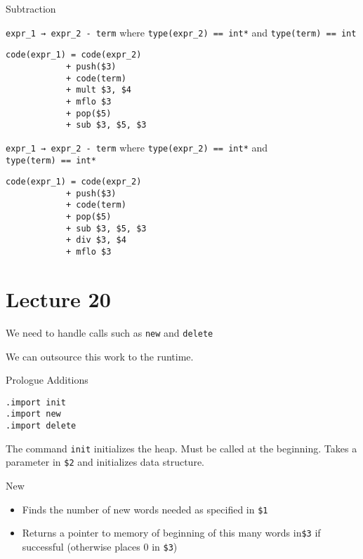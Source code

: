 \documentclass{article}
\begin{document}
Subtraction

\texttt{expr\_1\ →\ expr\_2\ -\ term} where
\texttt{type(expr\_2)\ ==\ int*} and \texttt{type(term)\ ==\ int}

\begin{tcolorbox}
\begin{verbatim}
code(expr_1) = code(expr_2)
            + push($3)
            + code(term)
            + mult $3, $4
            + mflo $3
            + pop($5)
            + sub $3, $5, $3
\end{verbatim}
\end{tcolorbox}

\texttt{expr\_1\ →\ expr\_2\ -\ term} where
\texttt{type(expr\_2)\ ==\ int*} and \texttt{type(term)\ ==\ int*}

\begin{tcolorbox}
\begin{verbatim}
code(expr_1) = code(expr_2)
            + push($3)
            + code(term)
            + pop($5)
            + sub $3, $5, $3
            + div $3, $4
            + mflo $3
\end{verbatim}
\end{tcolorbox}

\section{Lecture 20}\label{lecture-20}

We need to handle calls such as \texttt{new} and \texttt{delete}

We can outsource this work to the runtime.

Prologue Additions

\begin{tcolorbox}
\begin{verbatim}
.import init
.import new
.import delete
\end{verbatim}
\end{tcolorbox}

The command \texttt{init} initializes the heap. Must be called at the
beginning. Takes a parameter in \texttt{\$2} and initializes data
structure.

New
\begin{itemize}
    \item Finds the number of new words needed as specified in \texttt{\$1}
    \item  Returns a pointer to memory of beginning of this many words in\texttt{\$3} if successful (otherwise places \(0\) in \texttt{\$3})
\end{itemize}
\end{document}
